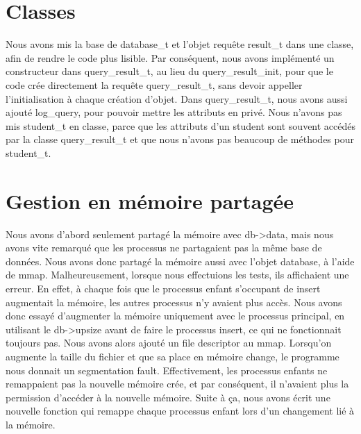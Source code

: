 \documentclass[utf8]{article}
\begin{document}
\section{Classes}
\indent{}
\par
Nous avons mis la base de database\_t et l'objet requête result\_t dans une classe, afin de rendre le code plus lisible. Par conséquent,
nous avons implémenté un constructeur dans query\_result\_t, au lieu du query\_result\_init, pour que le code
crée directement la requête query\_result\_t, sans devoir appeller l'initialisation à chaque création d'objet.
Dans query\_result\_t, nous avons aussi ajouté log\_query, pour pouvoir mettre les attributs en privé.
Nous n'avons pas mis student\_t en classe, parce que les attributs d'un student sont souvent accédés par la classe query\_result\_t
et que nous n'avons pas beaucoup de méthodes pour student\_t.
\par

\section{Gestion en mémoire partagée}
\indent{}
\par
Nous avons d'abord seulement partagé la mémoire avec db->data, mais nous avons vite remarqué que les processus
ne partagaient pas la même base de données. Nous avons donc partagé la mémoire aussi avec l'objet database, à l'aide de mmap.
Malheureusement, lorsque nous effectuions les tests, ils affichaient une erreur. En effet, à chaque fois que le processus enfant
s'occupant de insert augmentait la mémoire, les autres processus n'y avaient plus accès. Nous avons donc essayé d'augmenter la mémoire 
uniquement avec le processus principal, en utilisant le db->upsize avant de faire le processus insert, ce qui ne fonctionnait toujours pas. 
Nous avons alors ajouté un file descriptor au mmap.
Lorsqu'on augmente la taille du fichier et que sa place en mémoire change, le programme nous donnait un segmentation fault.
Effectivement, les processus enfants ne remappaient pas la nouvelle mémoire crée, et par conséquent, il n'avaient plus la permission d'accéder à la nouvelle mémoire.
 Suite à ça, nous avons écrit une nouvelle fonction qui remappe chaque processus enfant lors d'un changement lié à la mémoire. 
\par
\end{document}
